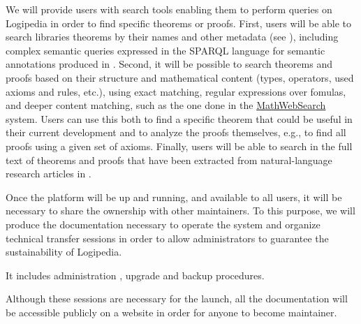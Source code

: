 \begin{workpackage}[id=access,wphases=0-48,type=MGT,
  short=Access,%
  title={Access to the infrastructure},
  lead=Irt,IrtRM=23,OcaRM=6,EduRM=12,InrRM=18]
\begin{tasklist}
  \begin{task}[id=search,
      title=Providing search tools,
      lead=Inr,InrRM=18]
    We will provide users with search tools enabling them to perform
    queries on Logipedia in order to find specific theorems or proofs.
    First, users will be able to search libraries theorems by their
    names and other metadata (see ),
    including complex semantic queries expressed in the SPARQL
    language for semantic annotations produced in
    . Second, it will be possible to
    search theorems and proofs based on their structure and
    mathematical content (types, operators, used axioms and rules,
    etc.), using exact matching, regular expressions over fomulas, and
    deeper content matching, such as the one done in the
    \hyperlink{https://kwarc.info/systems/mws/}{MathWebSearch}
    system. Users can use this both to find a specific theorem that
    could be useful in their current development and to analyze the
    proofs themselves, e.g., to find all proofs using a given set of
    axioms.  Finally, users will be able to search in the full text of
    theorems and proofs that have been extracted from natural-language
    research articles in .
  \end{task}

  \begin{task}[id=transfer,
      title=Transfer for the sustainability of the system,
      lead=Irt,IrtRM=1]
    Once the platform will be up and running, and available to all
    users, it will be necessary to share the ownership with other
    maintainers. To this purpose, we will produce the documentation
    necessary to operate the system and organize technical transfer
    sessions in order to allow administrators to guarantee the
    sustainability of Logipedia.

    It includes administration , upgrade and backup procedures.

    Although these sessions are necessary for the launch, all the
    documentation will be accessible publicly on a website in order
    for anyone to become maintainer.
  \end{task}

  \begin{task}[id=dedukti,
      title=Development of Dedukti checking and translation tools
      lead=Irt,InrRM=24]


\end{task}
\end{tasklist}
\end{workpackage}
